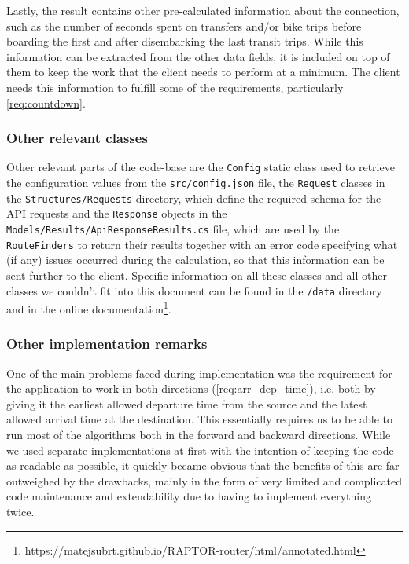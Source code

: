 Lastly, the result contains other pre-calculated information about the connection, such as the number of seconds spent on transfers and/or bike trips before boarding the first and after disembarking the last transit trips. While this information can be extracted from the other data fields, it is included on top of them to keep the work that the client needs to perform at a minimum. The client needs this information to fulfill some of the requirements, particularly \cref{req:countdown}.

\subsubsection{Other relevant classes}

Other relevant parts of the code-base are the \texttt{Config} static class used to retrieve the configuration values from the \texttt{src/config.json} file, the \texttt{Request} classes in the \texttt{Structures/Requests} directory, which define the required schema for the API requests and the \texttt{Response} objects in the \texttt{Models/Results/ApiResponseResults.cs} file, which are used by the \texttt{RouteFinders} to return their results together with an error code specifying what (if any) issues occurred during the calculation, so that this information can be sent further to the client. Specific information on all these classes and all other classes we couldn't fit into this document can be found in the \texttt{/data} directory and in the online documentation\footnote{https://matejsubrt.github.io/RAPTOR-router/html/annotated.html}.

\subsubsection{Other implementation remarks}

One of the main problems faced during implementation was the requirement for the application to work in both directions (\cref{req:arr_dep_time}), i.e. both by giving it the earliest allowed departure time from the source and the latest allowed arrival time at the destination. This essentially requires us to be able to run most of the algorithms both in the forward and backward directions. While we used separate implementations at first with the intention of keeping the code as readable as possible, it quickly became obvious that the benefits of this are far outweighed by the drawbacks, mainly in the form of very limited and complicated code maintenance and extendability due to having to implement everything twice.

